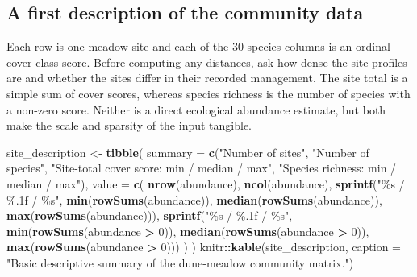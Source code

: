 \documentclass[
  english,
]{article}
\newenvironment{Shaded}{\begin{snugshade}}{\end{snugshade}}
\newcommand{\AttributeTok}[1]{\textcolor[rgb]{0.13,0.29,0.53}{#1}}
\newcommand{\DecValTok}[1]{\textcolor[rgb]{0.00,0.00,0.81}{#1}}
\newcommand{\FunctionTok}[1]{\textcolor[rgb]{0.13,0.29,0.53}{\textbf{#1}}}
\newcommand{\NormalTok}[1]{#1}
\newcommand{\OtherTok}[1]{\textcolor[rgb]{0.56,0.35,0.01}{#1}}
\newcommand{\SpecialCharTok}[1]{\textcolor[rgb]{0.81,0.36,0.00}{\textbf{#1}}}
\newcommand{\StringTok}[1]{\textcolor[rgb]{0.31,0.60,0.02}{#1}}
\begin{document}
\subsection{A first description of the community
data}\label{a-first-description-of-the-community-data}

Each row is one meadow site and each of the 30 species columns is an
ordinal cover-class score. Before computing any distances, ask how dense
the site profiles are and whether the sites differ in their recorded
management. The site total is a simple sum of cover scores, whereas
species richness is the number of species with a non-zero score. Neither
is a direct ecological abundance estimate, but both make the scale and
sparsity of the input tangible.

\begin{Shaded}
\begin{Highlighting}[]
\NormalTok{site\_description }\OtherTok{\textless{}{-}} \FunctionTok{tibble}\NormalTok{(}
  \AttributeTok{summary =} \FunctionTok{c}\NormalTok{(}\StringTok{"Number of sites"}\NormalTok{, }\StringTok{"Number of species"}\NormalTok{, }\StringTok{"Site{-}total cover score: min / median / max"}\NormalTok{,}
              \StringTok{"Species richness: min / median / max"}\NormalTok{),}
  \AttributeTok{value =} \FunctionTok{c}\NormalTok{(}
    \FunctionTok{nrow}\NormalTok{(abundance), }\FunctionTok{ncol}\NormalTok{(abundance),}
    \FunctionTok{sprintf}\NormalTok{(}\StringTok{"\%s / \%.1f / \%s"}\NormalTok{, }\FunctionTok{min}\NormalTok{(}\FunctionTok{rowSums}\NormalTok{(abundance)), }\FunctionTok{median}\NormalTok{(}\FunctionTok{rowSums}\NormalTok{(abundance)), }\FunctionTok{max}\NormalTok{(}\FunctionTok{rowSums}\NormalTok{(abundance))),}
    \FunctionTok{sprintf}\NormalTok{(}\StringTok{"\%s / \%.1f / \%s"}\NormalTok{, }\FunctionTok{min}\NormalTok{(}\FunctionTok{rowSums}\NormalTok{(abundance }\SpecialCharTok{\textgreater{}} \DecValTok{0}\NormalTok{)), }\FunctionTok{median}\NormalTok{(}\FunctionTok{rowSums}\NormalTok{(abundance }\SpecialCharTok{\textgreater{}} \DecValTok{0}\NormalTok{)), }\FunctionTok{max}\NormalTok{(}\FunctionTok{rowSums}\NormalTok{(abundance }\SpecialCharTok{\textgreater{}} \DecValTok{0}\NormalTok{)))}
\NormalTok{  )}
\NormalTok{)}
\NormalTok{knitr}\SpecialCharTok{::}\FunctionTok{kable}\NormalTok{(site\_description, }\AttributeTok{caption =} \StringTok{"Basic descriptive summary of the dune{-}meadow community matrix."}\NormalTok{)}
\end{Highlighting}
\end{Shaded}
\end{document}
